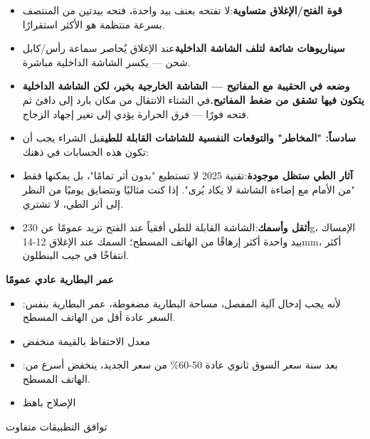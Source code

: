 \begin{itemize}
  \item \textbf{قوة الفتح/الإغلاق متساوية}:لا تفتحه بعنف بيد واحدة، فتحه بيدتين من المنتصف بسرعة منتظمة هو الأكثر استقرارًا.
  \item \textbf{سيناريوهات شائعة لتلف الشاشة الداخلية}عند الإغلاق يُحاصر سماعة رأس/كابل شحن — يكسر الشاشة الداخلية مباشرة.
  \item \textbf{وضعه في الحقيبة مع المفاتيح — الشاشة الخارجية بخير، لكن الشاشة الداخلية يتكون فيها تشقق من ضغط المفاتيح.}في الشتاء الانتقال من مكان بارد إلى دافئ ثم فتحه فورًا — فرق الحرارة يؤدي إلى تغير إجهاد الزجاج.
  \item \textbf{سادساً: "المخاطر" والتوقعات النفسية للشاشات القابلة للطي}قبل الشراء يجب أن تكون هذه الحسابات في ذهنك:
  \item \textbf{آثار الطي ستظل موجودة}:تقنية 2025 لا تستطيع "بدون أثر تمامًا"، بل يمكنها فقط "من الأمام مع إضاءة الشاشة لا يكاد يُرى". إذا كنت مثاليًا وتتضايق يوميًا من النظر إلى أثر الطي، لا تشتري.
  \item \textbf{أثقل وأسمك}:الشاشة القابلة للطي أفقياً عند الفتح تزيد عمومًا عن 230g، الإمساك بيد واحدة أكثر إرهاقًا من الهاتف المسطح؛ السمك عند الإغلاق 12-14mm، أكثر انتفاخًا في جيب البنطلون.
\end{itemize}

\textbf{عمر البطارية عادي عمومًا}\par

\begin{itemize}
  \item :لأنه يجب إدخال آلية المفصل، مساحة البطارية مضغوطة، عمر البطارية بنفس السعر عادة أقل من الهاتف المسطح.
  \item معدل الاحتفاظ بالقيمة منخفض
  \item :بعد سنة سعر السوق ثانوي عادة 50-60\% من سعر الجديد، ينخفض أسرع من الهاتف المسطح.
  \item الإصلاح باهظ
\end{itemize}


توافق التطبيقات متفاوت


